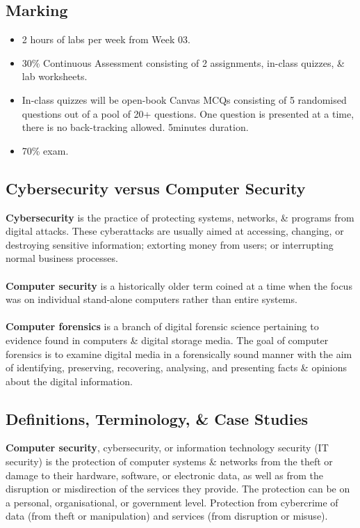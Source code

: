 \documentclass[a4paper,11pt]{article}
\begin{document}
\subsection{Marking}
\begin{itemize}
    \item   2 hours of labs per week from Week 03.
    \item   30\% Continuous Assessment consisting of 2 assignments, in-class quizzes, \& lab worksheets.
\item   In-class quizzes will be open-book Canvas MCQs consisting of 5 randomised questions out of a pool of 20+ questions.
        One question is presented at a time, there is no back-tracking allowed.
        5minutes duration.
    \item   70\% exam.
\end{itemize}

\subsection{Cybersecurity versus Computer Security}
\textbf{Cybersecurity} is the practice of protecting systems, networks, \& programs from digital attacks.
These cyberattacks are usually aimed at accessing, changing, or destroying sensitive information; extorting money from users; or interrupting normal business processes.
\\\\
\textbf{Computer security} is a historically older term coined at a time when the focus was on individual stand-alone computers rather than entire systems.
\\\\
\textbf{Computer forensics} is a branch of digital forensic science pertaining to evidence found in computers \& digital storage media.
The goal of computer forensics is to examine digital media in a forensically sound manner with the aim of identifying, preserving, recovering, analysing, and presenting facts \& opinions about the digital information. 

\subsection{Definitions, Terminology, \& Case Studies}
\textbf{Computer security}, cybersecurity, or information technology security (IT security) is the protection of computer systems \& networks from the theft or damage to their hardware, software, or electronic data, as well as from the disruption or misdirection of the services they provide.
The protection can be on a personal, organisational, or government level.
Protection from cybercrime of data (from theft or manipulation) and services (from disruption or misuse).
\end{document}
